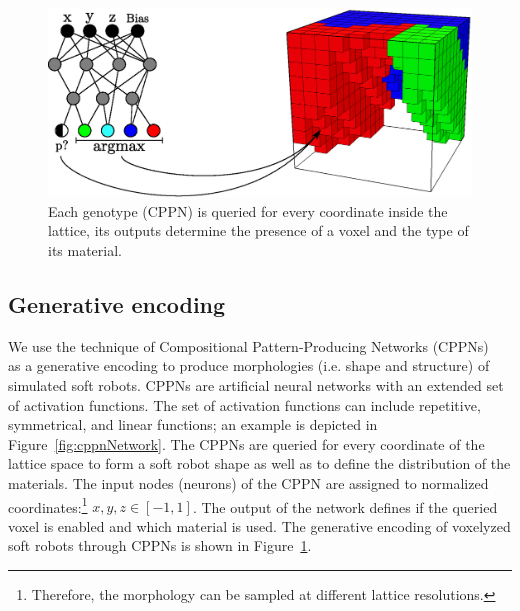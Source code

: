 \documentclass{sig-alternate}
\begin{document}
\begin{figure}[t!]
\centering
\includegraphics[width=0.35\textheight]{../Figures/Misc/cppnSoftBot.eps}
\caption{Each genotype (CPPN) is queried for every coordinate inside the lattice, its outputs determine the presence of a voxel and the type of its material.}
\label{fig:cppnDiagram}
\end{figure}

\subsection{Generative encoding}
We use the technique of Compositional Pattern-Producing Networks (CPPNs)~\cite{stanley2007compositional} as a generative encoding to produce morphologies (i.e. shape and structure) of simulated soft robots. CPPNs are artificial neural networks with an extended set of activation functions. The set of activation functions can include repetitive, symmetrical, and linear functions; an example is depicted in Figure~\ref{fig:cppnNetwork}. The CPPNs are queried for every coordinate of the lattice space to form a soft robot shape as well as to define the distribution of the materials. The input nodes (neurons) of the CPPN are assigned to normalized coordinates:\footnote{Therefore, the morphology can be sampled at different lattice resolutions.} $x,y,z \in [-1, 1]$. The output of the network defines if the queried voxel is enabled and which material is used. The generative encoding of voxelyzed soft robots through CPPNs is shown in Figure~\ref{fig:cppnDiagram}. 

\newpage
\end{document}
